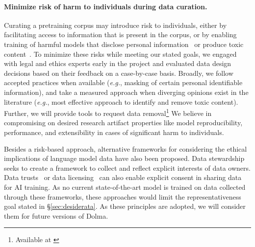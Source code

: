 \documentclass{article}
\newcommand{\dolma}{Dolma\xspace}
\begin{document}
\paragraph{Minimize risk of harm to individuals during data curation.}

Curating a pretraining corpus may introduce risk to individuals, either by facilitating access to information that is present in the corpus, or by enabling training of harmful models
that disclose personal information~\citep{Carlini2020-jx} or produce toxic content~\citep{gehman-etal-2020-realtoxicityprompts,Ngo2021-fn}.
To minimize these risks while meeting our stated goals, we engaged with legal and ethics experts 
early in the project and evaluated data design decisions based on their feedback on a case-by-case basis.
Broadly, we follow accepted practices when available (\textit{e.g.}, masking of certain personal identifiable information), and take a measured approach when diverging opinions exist in the literature (\textit{e.g.}, most effective approach to identify and remove toxic content). 
Further, we will provide tools to request data removal\footnote{\label{foot:removal}Available at {\href{https://docs.google.com/forms/d/e/1FAIpQLSfL6KzFR7xNJj6MPyV1uikIpj-VmrftC9mjty2nXzSClU2rnw/viewform}{}}}
We believe in compromising on desired research artifact properties like model reproducibility, performance, and extensibility in cases of significant harm to individuals.

Besides a risk-based approach, alternative frameworks for considering the ethical implications of language model data have also been proposed.
Data stewardship~\citep{Jernite2022DataGI} seeks to create a framework to collect and reflect explicit interests of data owners. 
Data trusts~\citep{datatrust} or data licensing~\citep{licensing} can also enable explicit consent in sharing data for AI training. 
As no current state-of-the-art model is trained on data collected through these frameworks, these approaches would limit the representativeness goal stated in \S\ref{sec:desiderata}.
As these principles are adopted, we will consider them for future versions of \dolma.
\end{document}

